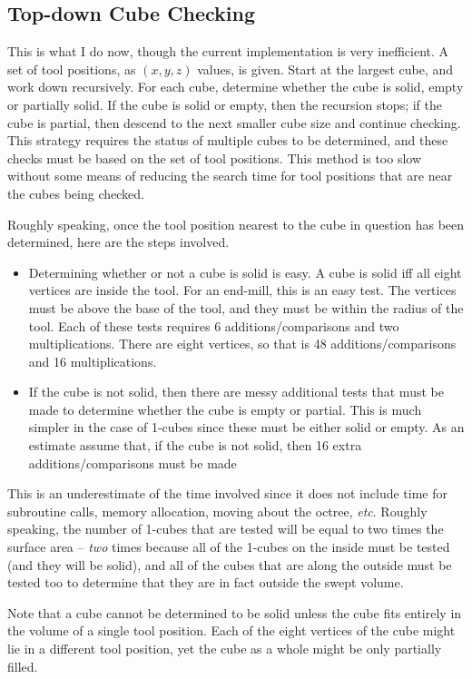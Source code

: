 \documentclass[titlepage,oneside,10pt]{article}
\begin{document}
\subsection{Top-down Cube Checking}

This is what I do now, though the current implementation is very
inefficient. A set of tool positions, as $(x,y,z)$ values, is
given. Start at the largest cube, and work down recursively. For each
cube, determine whether the cube is solid, empty or partially
solid. If the cube is solid or empty, then the recursion stops; if the
cube is partial, then descend to the next smaller cube size and
continue checking. This strategy requires the status of multiple cubes to be
determined, and these checks must be based on the set of tool
positions. This method is too slow without some means of reducing the
search time for tool positions that are near the cubes being checked.

Roughly speaking, once the tool position nearest to the cube in
question has been determined, here are the steps involved.
\begin{itemize}
\item Determining whether or not a cube is solid is easy. A cube is
  solid iff all eight vertices are inside the tool. For an end-mill,
  this is an easy test. The vertices must be above the base of the
  tool, and they must be within the radius of the tool. Each of these
  tests requires 6 additions/comparisons and two
  multiplications. There are eight vertices, so that is 48
  additions/comparisons and 16 multiplications.
\item If the cube is not solid, then there are messy additional tests
  that must be made to determine whether the cube is empty or
  partial. This is much simpler in the case of 1-cubes since these
  must be either solid or empty. As an estimate assume that, if the
  cube is not solid, then 16 extra additions/comparisons must be made
\end{itemize}
This is an underestimate of the time involved since it does not
include time for subroutine calls, memory allocation, moving about the
octree, \emph{etc}.
Roughly speaking, the number of 1-cubes that are tested will be equal
to two times the surface area -- \emph{two} times because all of the
1-cubes on the inside must be tested (and they will be solid), and all
of the cubes that are along the outside must be tested too to
determine that they are in fact outside the swept volume.

Note that a cube cannot be determined to be solid unless the
cube fits entirely in the volume of a single tool position. Each of
the eight vertices of the cube might lie in a different tool position,
yet the cube as a whole might be only partially filled.
\end{document}
